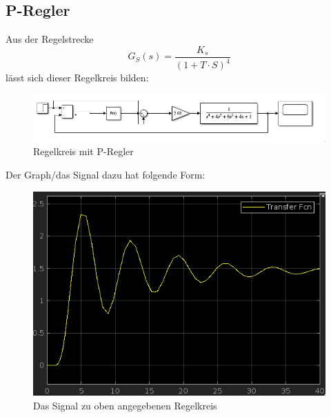 \documentclass{article}
\begin{document}
		\subsection{P-Regler}
			Aus der Regelstrecke 
			$$G_S(s) = \frac{K_s}{(1 + T\cdot S)^4}$$
			lässt sich dieser Regelkreis bilden:
			\begin{figure}[h]
				\includegraphics[scale=0.6, center]{4_a_Blockschaltbild.png}
				\caption{Regelkreis mit P-Regler}
				\label{fig33: Blockschaltbild_P_Regler}
			\end{figure}
			Der Graph/das Signal dazu hat folgende Form:
			\begin{figure}[h]
				\includegraphics[scale = 0.6, center]{4_a_Graph.png}
				\caption{Das Signal zu oben angegebenen Regelkreis}
				\label{fig34: 4_a_Graph}
			\end{figure}
\newpage
\end{document}
